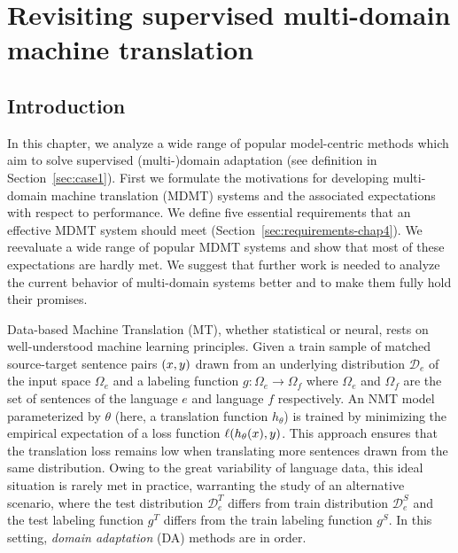 \chapter{Revisiting supervised multi-domain machine translation} \label{chap:revisiting}
\section{Introduction}
In this chapter, we analyze a wide range of popular model-centric methods which aim to solve supervised (multi-)domain adaptation (see definition in Section~\ref{sec:case1}). First we formulate the motivations for developing multi-domain machine translation (MDMT) systems and the associated expectations with respect to performance. We define five essential requirements that an effective MDMT system should meet (Section~\ref{sec:requirements-chap4}). We reevaluate a wide range of popular MDMT systems and show that most of these expectations are hardly met. We suggest that further work is needed to analyze the current behavior of multi-domain systems better and to make them fully hold their promises.

Data-based Machine Translation (MT), whether statistical or neural, rests on well-understood machine learning principles. Given a train sample of matched source-target sentence pairs $(x,y)$ drawn from an underlying distribution $\mathcal{D}_e$ of the input space $\Omega_e$ and a labeling function $g: \Omega_e \rightarrow \Omega_f$ where $\Omega_e$ and $\Omega_f$ are the set of sentences of the language $e$ and language $f$ respectively. An NMT model parameterized by $\theta$ (here, a translation function $h_{\theta}$) is trained by minimizing the empirical expectation of a loss function $\ell(h_\theta(x),y)$. This approach ensures that the translation loss remains low when translating more sentences drawn from the same distribution. Owing to the great variability of language data, this ideal situation is rarely met in practice, warranting the study of an alternative scenario, where the test distribution $\mathcal{D}_e^T$ differs from train distribution $\mathcal{D}_e^S$ and the test labeling function $g^T$ differs from the train labeling function $g^S$. In this setting, \emph{domain adaptation} (DA) methods are in order.

